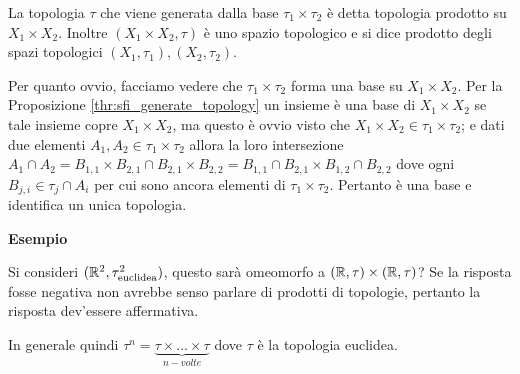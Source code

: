 \begin{definition}
	La topologia $\tau$ che viene generata dalla base $\tau_1 \times \tau_2$ è detta topologia prodotto su $X_1 \times X_2$. Inoltre $(X_1 \times X_2, \tau)$ è uno spazio topologico e si dice prodotto degli spazi topologici $(X_1, \tau_1), (X_2, \tau_2)$.
\end{definition}

\begin{remark}
	Per quanto ovvio, facciamo vedere che $\tau_1 \times \tau_2$ forma una base su $X_1 \times X_2$. Per la Proposizione \ref{thr:sfi_generate_topology} un insieme è una base di $X_1 \times X_2$ se tale insieme copre $X_1 \times X_2$, ma questo è ovvio visto che $X_1 \times X_2 \in \tau_1 \times \tau_2$; e dati due elementi $A_1, A_2 \in \tau_1 \times \tau_2$ allora la loro intersezione $A_1 \cap A_2 = B_{1,1} \times B_{2,1} \cap B_{2,1} \times B_{2,2} = B_{1,1}\cap B_{2,1} \times B_{1,2} \cap B_{2,2}$ dove ogni $B_{j,i} \in \tau_j \cap A_i$ per cui sono ancora elementi di $\tau_1 \times \tau_2$. Pertanto è una base e identifica un unica topologia.
\end{remark}

\textbf{Esempio}

Si consideri $(\mathbb{R}^2, \tau^2_{\text{euclidea}})$, questo sarà omeomorfo a $(\mathbb{R}, \tau) \times (\mathbb{R}, \tau)$? Se la risposta fosse negativa non avrebbe senso parlare di prodotti di topologie, pertanto la risposta dev'essere affermativa. 


In generale quindi $\tau^n = \underset{n-volte}{\underbrace{\tau \times \dots \times \tau}}$ dove $\tau$ è la topologia euclidea. 

